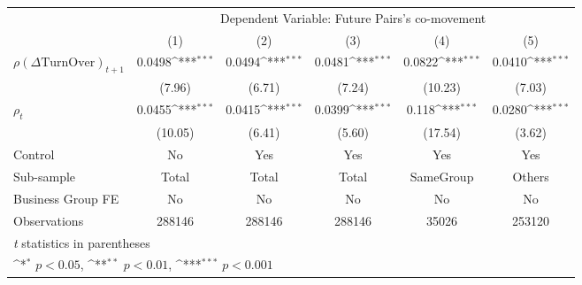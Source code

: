 {
\def\sym#1{\ifmmode^{#1}\else\(^{#1}\)\fi}
\begin{tabular}{l*{5}{c}}
\hline\hline
                &\multicolumn{5}{c}{Dependent Variable:  Future Pairs's co-movement}                           \\\cmidrule(lr){2-6}
                &\multicolumn{1}{c}{(1)}         &\multicolumn{1}{c}{(2)}         &\multicolumn{1}{c}{(3)}         &\multicolumn{1}{c}{(4)}         &\multicolumn{1}{c}{(5)}         \\
\hline
 $ {\rho(\Delta \text{TurnOver})_{t+1}} $ &   0.0498\sym{***}&   0.0494\sym{***}&   0.0481\sym{***}&   0.0822\sym{***}&   0.0410\sym{***}\\
                &   (7.96)         &   (6.71)         &   (7.24)         &  (10.23)         &   (7.03)         \\
[1em]
 $ {\rho_t} $   &   0.0455\sym{***}&   0.0415\sym{***}&   0.0399\sym{***}&    0.118\sym{***}&   0.0280\sym{***}\\
                &  (10.05)         &   (6.41)         &   (5.60)         &  (17.54)         &   (3.62)         \\
\hline
Control         &       No         &      Yes         &      Yes         &      Yes         &      Yes         \\
Sub-sample      &    Total         &    Total         &    Total         &SameGroup         &   Others         \\
Business Group FE&       No         &       No         &       No         &       No         &       No         \\
Observations    &   288146         &   288146         &   288146         &    35026         &   253120         \\
\hline\hline
\multicolumn{6}{l}{\footnotesize \textit{t} statistics in parentheses}\\
\multicolumn{6}{l}{\footnotesize \sym{*} \(p<0.05\), \sym{**} \(p<0.01\), \sym{***} \(p<0.001\)}\\
\end{tabular}
}
